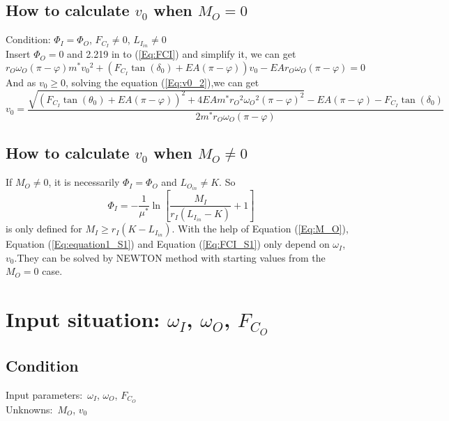 \documentclass[a4paper,fleqn,13pt]{article}
\begin{document}
\subsection{How to calculate $v_0$ when $M_O = 0$}
Condition: $\Phi_I=\Phi_O$, $F_{C_I} \not = 0$, $L_{I_{in}} \neq 0$ \\
Insert $\Phi_O = 0$ and 2.219 in to (\ref{Eq:FCI}) and simplify it, we can get
\begin{equation} \label{Eq:v0_2}
 r_O\omega_O (\pi-\varphi) m^*{v_0}^2+(F_{C_I}\tan(\delta_0) + EA(\pi-\varphi) )v_0 - EA r_O\omega_O(\pi-\varphi)  = 0
\end{equation}
And as $v_0 \geq 0$, solving the equation (\ref{Eq:v0_2}),we can get 
\begin{equation} \label{Eq:v0_start2}
 v_0=\frac{\sqrt{{\left(F_{C_I}\tan(\theta_0) + EA(\pi-\varphi)\right)}^2  + 4EAm^*{r_O}^2{\omega_O}^2{(\pi-\varphi)}^2 }  - EA(\pi-\varphi) - F_{C_I} \tan(\delta_0)}{2m^*r_O\omega_O(\pi-\varphi)}
\end{equation}


\subsection{How to calculate $v_0$ when $M_O \not = 0$ }
If $M_O \not = 0$, it is necessarily $\Phi_I=\Phi_O$ and $L_{O_{in}} \neq K$. So
\begin{equation}
 \Phi_I= - \frac{1}{\mu^*} \ln {\left[\frac{M_I}{ r_I (L_{I_{in}} - K)} + 1\right]}
\end{equation}
is only defined for $M_I \geq r_I(K - L_{I_{in}})$.
With the help of Equation (\ref{Eq:M_O}), Equation (\ref{Eq:equation1_S1}) and Equation (\ref{Eq:FCI_S1}) only depend on $\omega_I$, $v_0$.They can be solved by NEWTON method
with starting values from the $M_O = 0$ case.




\section{Input situation: $\omega_I$, $\omega_O$, $F_{C_O}$}

\subsection{Condition}
Input parameters:\ $\omega_I$, $\omega_O$, $F_{C_O}$ \\
Unknowns:\ $M_O$, $v_0$
\end{document}
